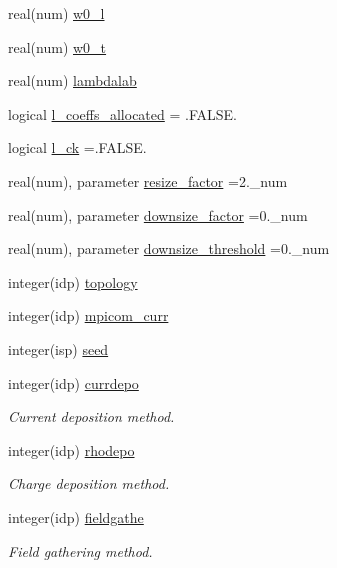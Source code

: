 \begin{DoxyCompactItemize}
real(num) \hyperlink{namespaceparams_a099f9a730e6ea2a9410eb86769458372}{w0\+\_\+l}
\item 
real(num) \hyperlink{namespaceparams_a7a94c587421680abbe506082d28ff8b6}{w0\+\_\+t}
\item 
real(num) \hyperlink{namespaceparams_a24b22ed48dbf0d3d0f582e6db7d40a76}{lambdalab}
\item 
logical \hyperlink{namespaceparams_abbe8f0ac16d41f275328feb0a5d63fed}{l\+\_\+coeffs\+\_\+allocated} = .F\+A\+L\+S\+E.
\item 
logical \hyperlink{namespaceparams_a7e70ec0bfba23188ddeb3004e464a69b}{l\+\_\+ck} =.F\+A\+L\+S\+E.
\item 
real(num), parameter \hyperlink{namespaceparams_a70195e670ef122bc4f91d74793b68621}{resize\+\_\+factor} =2.\+\_\+num
\item 
real(num), parameter \hyperlink{namespaceparams_a1e70b45a865ed6ef7927e0b49669a567}{downsize\+\_\+factor} =0.\+\_\+num
\item 
real(num), parameter \hyperlink{namespaceparams_aa81c22d18e165451716c4b23ea6fbdb1}{downsize\+\_\+threshold} =0.\+\_\+num
\item 
integer(idp) \hyperlink{namespaceparams_a259d1ed7155ef66db12c877a797fc0f0}{topology}
\item 
integer(idp) \hyperlink{namespaceparams_a5e7c931ca55f3ac5e5171dc97c3269b1}{mpicom\+\_\+curr}
\item 
integer(isp) \hyperlink{namespaceparams_ae32095407c8380779cfc1562a62d15e3}{seed}
\item 
integer(idp) \hyperlink{namespaceparams_af4ccf29a8c1f3a8a47f08f5cbbcd30eb}{currdepo}
\begin{DoxyCompactList}\small\item\em Current deposition method. \end{DoxyCompactList}\item 
integer(idp) \hyperlink{namespaceparams_ae892561d7462a1e54b9b6b2bbe1adc4c}{rhodepo}
\begin{DoxyCompactList}\small\item\em Charge deposition method. \end{DoxyCompactList}\item 
integer(idp) \hyperlink{namespaceparams_afef819010f4c590b2d6f9ecde05bd4c5}{fieldgathe}
\begin{DoxyCompactList}\small\item\em Field gathering method. \end{DoxyCompactList}\item 

\end{DoxyCompactItemize}
